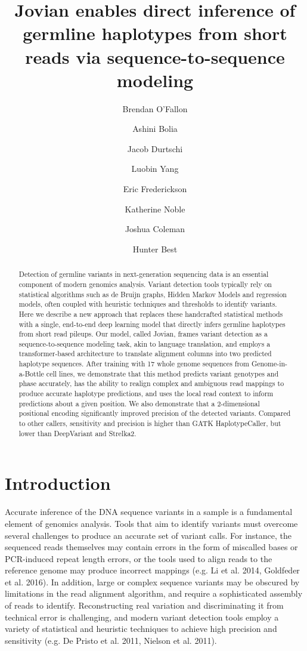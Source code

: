 \documentclass[]{article}
\title{Jovian enables direct inference of germline haplotypes from short reads via sequence-to-sequence modeling}
\author[1]{Brendan O'Fallon}
\author[1]{Ashini Bolia}
\author[1]{Jacob Durtschi}
\author[1]{Luobin Yang}
\author[1]{Eric Frederickson}
\author[1]{Katherine Noble}
\author[1]{Joshua Coleman}
\author[1]{Hunter Best}
\affil[1]{ARUP Institute for Clinical and Experimental Pathology, Salt Lake City, UT}
\date{}
\begin{document}
\maketitle

\begin{abstract}
	Detection of germline variants in next-generation sequencing data is an essential component of modern genomics analysis. Variant detection tools typically rely on statistical algorithms such as de Bruijn graphs, Hidden Markov Models and regression models, often coupled with heuristic techniques and thresholds to identify variants. Here we describe a new approach that replaces these handcrafted statistical methods with a single, end-to-end deep learning model that directly infers germline haplotypes from short read pileups. Our model, called Jovian, frames variant detection as a sequence-to-sequence modeling task, akin to language translation, and employs a transformer-based architecture to translate alignment columns into two predicted haplotype sequences. After training with 17 whole genome sequences from Genome-in-a-Bottle cell lines, we demonstrate that this method predicts variant genotypes and phase accurately, has the ability to realign complex and ambiguous read mappings to produce accurate haplotype predictions, and uses the local read context to inform predictions about a given position. We also demonstrate that a 2-dimensional positional encoding significantly improved precision of the detected variants. Compared to other callers, sensitivity and precision is higher than GATK HaplotypeCaller, but lower than DeepVariant and Strelka2. 
\end{abstract}


\section{Introduction}

Accurate inference of the DNA sequence variants in a sample is a fundamental element of genomics analysis. Tools that aim to identify variants must overcome several challenges to produce an accurate set of variant calls. For instance, the sequenced reads themselves may contain errors in the form of miscalled bases or PCR-induced repeat length errors, or the tools used to align reads to the reference genome may produce incorrect mappings (e.g. Li et al. 2014, Goldfeder et al. 2016).  In addition, large or complex sequence variants may be obscured by limitations in the read alignment algorithm, and require a sophisticated assembly of reads to identify. Reconstructing real variation and discriminating it from technical error is challenging, and modern variant detection tools employ a variety of statistical and heuristic techniques to achieve high precision and sensitivity (e.g. De Pristo et al. 2011, Nielson et al. 2011). 
\end{document}
